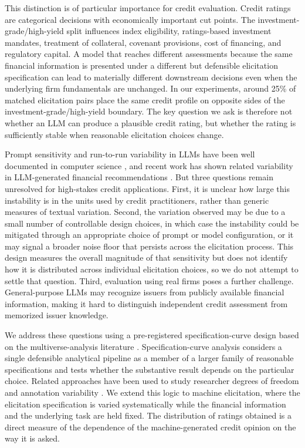 \documentclass[a4paper,fleqn]{cas-sc}
\begin{document}
This distinction is of particular importance for credit evaluation. Credit ratings are categorical
decisions with economically important cut points. The investment-grade/high-yield split influences index
eligibility, ratings-based investment mandates, treatment of collateral, covenant provisions, cost of
financing, and regulatory capital. A model that reaches different assessments because the same financial
information is presented under a different but defensible elicitation specification can lead to materially
different downstream decisions even when the underlying firm fundamentals are unchanged. In our
experiments, around 25\% of matched elicitation pairs place the same credit profile on opposite sides of
the investment-grade/high-yield boundary. The key question we ask is therefore not whether an LLM can
produce a plausible credit rating, but whether the rating is sufficiently stable when reasonable
elicitation choices change.

Prompt sensitivity and run-to-run variability in LLMs have been well documented in computer science
\citep{atil2024nondeterminism,kaplan2020scaling}, and recent work has shown related variability in
LLM-generated financial recommendations \citep{chon2025variability}. But three questions remain
unresolved for high-stakes credit applications. First, it is unclear how large this
instability is in the units used by credit practitioners, rather than generic measures of textual
variation. Second, the variation observed may be due to a small number of controllable design choices,
in which case the instability could be mitigated through an appropriate choice of prompt or model
configuration, or it may signal a broader noise floor that persists across the elicitation process.
This design measures the overall magnitude of that sensitivity but does not identify how it is
distributed across individual elicitation choices, so we do not attempt to settle that question. Third,
evaluation using real firms poses a further challenge. General-purpose LLMs may recognize issuers from
publicly available financial information, making it hard to distinguish independent credit assessment
from memorized issuer knowledge.

We address these questions using a pre-registered specification-curve design based on the
multiverse-analysis literature \citep{simonsohn2020specification,steegen2016multiverse}.
Specification-curve analysis considers a single defensible analytical pipeline as a member of a larger
family of reasonable specifications and tests whether the substantive result depends on the particular
choice. Related approaches have been used to study researcher degrees of freedom and annotation
variability \citep{camuffo2026variance}. We extend this logic to machine elicitation, where the
elicitation specification is varied systematically while the financial information and the underlying
task are held fixed. The distribution of ratings obtained is a direct measure of the dependence of the
machine-generated credit opinion on the way it is asked.
\end{document}

